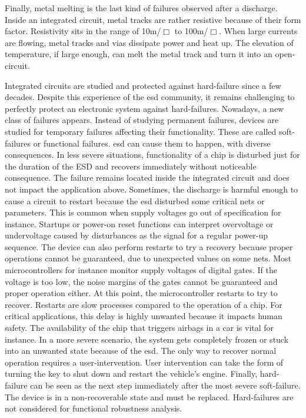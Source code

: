 Finally, metal melting is the last kind of failures observed after a discharge.
Inside an integrated circuit, metal tracks are rather resistive because of their form factor.
Resistivity sits in the range of 10m\textOmega{}/$\Box$ to 100m\textOmega/$\Box$.
When large currents are flowing, metal tracks and vias dissipate power and heat up.
The elevation of temperature, if large enough, can melt the metal track and turn it into an open-circuit.

Integrated circuits are studied and protected against hard-failure since a few decades.
Despite this experience of the \gls{esd} community, it remains challenging to perfectly protect an electronic system against hard-failures.
Nowadays, a new class of failures appears.
Instead of studying permanent failures, devices are studied for temporary failures affecting their functionality.
These are called soft-failures or functional failures.
\gls{esd} can cause them to happen, with diverse consequences.
In less severe situations, functionality of a chip is disturbed just for the duration of the ESD and recovers immediately without noticeable consequence.
The failure remains located inside the integrated circuit and does not impact the application above.
Sometimes, the discharge is harmful enough to cause a circuit to restart because the \gls{esd} disturbed some critical nets or parameters.
This is common when supply voltages go out of specification for instance.
Startups or power-on reset functions can interpret overvoltage or undervoltage caused by disturbances as the signal for a regular power-up sequence.
The device can also perform restarts to try a recovery because proper operations cannot be guaranteed, due to unexpected values on some nets.
Most microcontrollers for instance monitor supply voltages of digital gates.
If the voltage is too low, the noise margins of the gates cannot be guaranteed and proper operation either.
At this point, the microcontroller restarts to try to recover.
Restarts are slow processes compared to the operation of a chip.
For critical applications, this delay is highly unwanted because it impacts human safety.
The availability of the chip that triggers airbags in a car is vital for instance.
In a more severe scenario, the system gets completely frozen or stuck into an unwanted state because of the \gls{esd}.
The only way to recover normal operation requires a user-intervention.
User intervention can take the form of turning the key to shut down and restart the vehicle's engine.
Finally, hard-failure can be seen as the next step immediately after the most severe soft-failure.
The device is in a non-recoverable state and must be replaced.
Hard-failures are not considered for functional robustness analysis.

